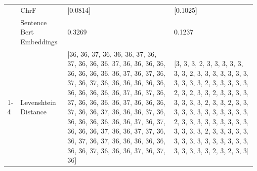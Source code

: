 \begin{tabular}{llll}
 & ChrF & [0.0814] & [0.1025] \\
 & Sentence Bert Embeddings & 0.3269 & 0.1237 \\
\cline{1-4}
\multirow[t]{4}{*}{Omwana omubi takaddiwa ewaka.} & Levenshtein Distance & [36, 36, 37, 36, 36, 36, 37, 36, 37, 36, 36, 36, 37, 36, 36, 36, 36, 36, 36, 36, 36, 36, 37, 36, 37, 36, 37, 36, 37, 36, 36, 36, 36, 36, 36, 36, 36, 36, 36, 36, 37, 36, 37, 36, 37, 36, 36, 36, 36, 37, 36, 36, 36, 37, 36, 36, 37, 36, 36, 36, 37, 36, 36, 36, 36, 36, 36, 36, 37, 36, 37, 36, 36, 36, 37, 36, 36, 37, 37, 36, 36, 37, 36, 37, 36, 36, 36, 36, 36, 36, 36, 37, 36, 36, 36, 37, 36, 37, 36] & [3, 3, 3, 2, 3, 3, 3, 3, 3, 3, 3, 2, 3, 3, 3, 3, 3, 3, 3, 3, 3, 3, 3, 2, 3, 3, 3, 3, 3, 2, 3, 2, 3, 3, 2, 3, 3, 3, 3, 3, 3, 3, 3, 2, 3, 3, 2, 3, 3, 3, 3, 3, 3, 3, 3, 3, 3, 3, 3, 2, 3, 3, 3, 3, 3, 3, 3, 3, 3, 3, 3, 3, 3, 2, 3, 3, 3, 3, 3, 3, 3, 3, 3, 3, 3, 3, 3, 3, 3, 3, 3, 3, 3, 3, 2, 3, 2, 3, 3] \\

\end{tabular}
